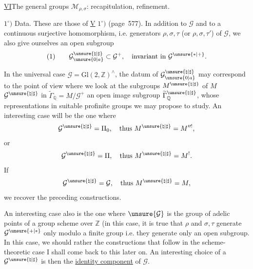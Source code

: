 

\uline{VI}\quad The general groups $\mathcal{M}_{\rho,\sigma}$:
recapitulation, refinement.

$1^\circ)$ Data. These are those of \uline{V} $1^\circ)$ (page~577).
In addition to $\mathcal{G}$  and to
a continuous surjective homomorphism, i.e. generators $\rho,\sigma,\tau$
(or $\rho,\sigma,\tau'$) of $\mathcal{G}$, we also give ourselves an open subgroup
\[
(1)\qquad \mathcal{G}_{\unsure{0|a}}^{\unsure{\natural|\sharp}}
\subset\mathcal{G}^{+},\quad
\text{invariant in }\mathcal{G}^{\unsure{*|+}}.
\]

In the universal case $\mathcal{G}=\mathrm{Gl}(2,\mathbb{Z})^{\wedge}$,
the datum of $\mathcal{G}_{\unsure{0|a}}^{\unsure{\natural|\sharp}}$
may correspond to the point of view where we look at the subgroups
$M^{\unsure{\natural|\sharp}}$ of $M$
$\mathcal{G}^{\unsure{\natural|\sharp}}$
in $\widetilde{\Gamma}_{\mathbb{Q}}=M/\mathcal{G}^{+}$
an open image subgroup
$\widetilde{\Gamma}_{\mathbb{Q}}^{\unsure{\natural|\sharp}}$,
whose representations in suitable profinite groups we may propose to study.
An interesting case will be the one where
\[
\mathcal{G}^{\unsure{\natural|\sharp}}=\Pi_{0},\quad
\text{thus }M^{\unsure{\natural|\sharp}}=M^{\prime\prime!},
\]
or
\[
\mathcal{G}^{\unsure{\natural|\sharp}}=\Pi,\quad
\text{thus }M^{\unsure{\natural|\sharp}}=M^{!}.
\]
If
\[
\mathcal{G}^{\unsure{\natural|\sharp}}=\mathcal{G},\quad
\text{thus }M^{\unsure{\natural|\sharp}}=M,
\]
we recover the preceding constructions.



An interesting case also is the one where $\unsure{\mathcal{G}}$ is the group
of adelic  points of a group scheme over $\mathbb{Z}$
(in this case, it is true that $\rho$ and $\sigma,\tau$ generate
 $\mathcal{G}^{\unsure{+|*}}$ only modulo a finite group
i.e. they generate  only an open subgroup.
In this case, we should rather \uline{} the constructions
that follow in the scheme-theoretic case
I shall come back to this later on. An interesting choice of a
$\mathcal{G}^{\unsure{\natural|\sharp}}$ is then the
\uline{identity component} of $\mathcal{G}$.

